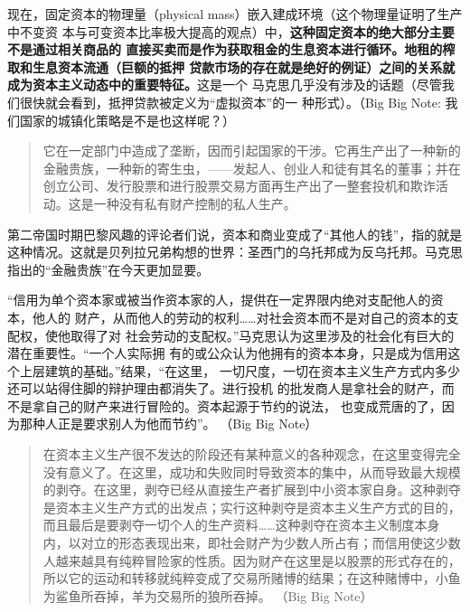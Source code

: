 现在，固定资本的物理量（physical mass）嵌入建成环境（这个物理量证明了生产中不变资
本与可变资本比率极大提高的观点）中，\textbf{这种固定资本的绝大部分主要不是通过相关商品的
直接买卖而是作为获取租金的生息资本进行循环。地租的榨取和生息资本流通（巨额的抵押
贷款市场的存在就是绝好的例证）之间的关系就成为资本主义动态中的重要特征。}这是一个
马克思几乎没有涉及的话题（尽管我们很快就会看到，抵押贷款被定义为“虚拟资本”的一
种形式）。（Big Big Note: 我们国家的城镇化策略是不是也这样呢？）

\begin{quotation}


它在一定部门中造成了垄断，因而引起国家的干涉。它再生产出了一种新的金融贵族，一种新的寄生虫，——发起人、创业人和徒有其名的董事；并在创立公司、发行股票和进行股票交易方面再生产出了一整套投机和欺诈活动。这是一种没有私有财产控制的私人生产。 

\end{quotation}
第二帝国时期巴黎风趣的评论者们说，资本和商业变成了“其他人的钱”，指的就是这种情况。这就是贝列拉兄弟构想的世界：圣西门的乌托邦成为反乌托邦。马克思指出的“金融贵族”在今天更加显要。

“信用为单个资本家或被当作资本家的人，提供在一定界限内绝对支配他人的资本，他人的
财产，从而他人的劳动的权利……对社会资本而不是对自己的资本的支配权，使他取得了对
社会劳动的支配权。”马克思认为这里涉及的社会化有巨大的潜在重要性。“一个人实际拥
有的或公众认为他拥有的资本本身，只是成为信用这个上层建筑的基础。”结果，“在这里，
一切尺度，一切在资本主义生产方式内多少还可以站得住脚的辩护理由都消失了。进行投机
的批发商人是拿社会的财产，而不是拿自己的财产来进行冒险的。资本起源于节约的说法，
也变成荒唐的了，因为那种人正是要求别人为他而节约”。 （Big Big Note）

\begin{quotation}
在资本主义生产很不发达的阶段还有某种意义的各种观念，在这里变得完全没有意义了。在这里，成功和失败同时导致资本的集中，从而导致最大规模的剥夺。在这里，剥夺已经从直接生产者扩展到中小资本家自身。这种剥夺是资本主义生产方式的出发点；实行这种剥夺是资本主义生产方式的目的，而且最后是要剥夺一切个人的生产资料……这种剥夺在资本主义制度本身内，以对立的形态表现出来，即社会财产为少数人所占有；而信用使这少数人越来越具有纯粹冒险家的性质。因为财产在这里是以股票的形式存在的，所以它的运动和转移就纯粹变成了交易所赌博的结果；在这种赌博中，小鱼为鲨鱼所吞掉，羊为交易所的狼所吞掉。 （Big Big Note）

\end{quotation}

